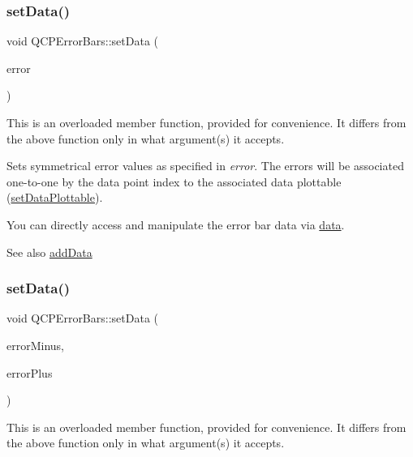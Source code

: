 \subsubsection{\texorpdfstring{set\+Data()}{setData()}\hspace{0.1cm}{\footnotesize\ttfamily [2/3]}}
{\footnotesize\ttfamily void Q\+C\+P\+Error\+Bars\+::set\+Data (\begin{DoxyParamCaption}\item[{const Q\+Vector$<$ double $>$ \&}]{error }\end{DoxyParamCaption})}

This is an overloaded member function, provided for convenience. It differs from the above function only in what argument(s) it accepts.

Sets symmetrical error values as specified in {\itshape error}. The errors will be associated one-\/to-\/one by the data point index to the associated data plottable (\hyperlink{classQCPErrorBars_aabb42a964cfbf780cd1c79850c7cd989}{set\+Data\+Plottable}).

You can directly access and manipulate the error bar data via \hyperlink{classQCPErrorBars_aeebd1b14f4c3573565efafd514988813}{data}.

\begin{DoxySeeAlso}{See also}
\hyperlink{classQCPErrorBars_aae296ad9817b3fa418db284af81cecf8}{add\+Data} 
\end{DoxySeeAlso}
\mbox{\label{classQCPErrorBars_aac0cf070b957c11177e91b02bcb433c8}} 
\subsubsection{\texorpdfstring{set\+Data()}{setData()}\hspace{0.1cm}{\footnotesize\ttfamily [3/3]}}
{\footnotesize\ttfamily void Q\+C\+P\+Error\+Bars\+::set\+Data (\begin{DoxyParamCaption}\item[{const Q\+Vector$<$ double $>$ \&}]{error\+Minus,  }\item[{const Q\+Vector$<$ double $>$ \&}]{error\+Plus }\end{DoxyParamCaption})}

This is an overloaded member function, provided for convenience. It differs from the above function only in what argument(s) it accepts.

